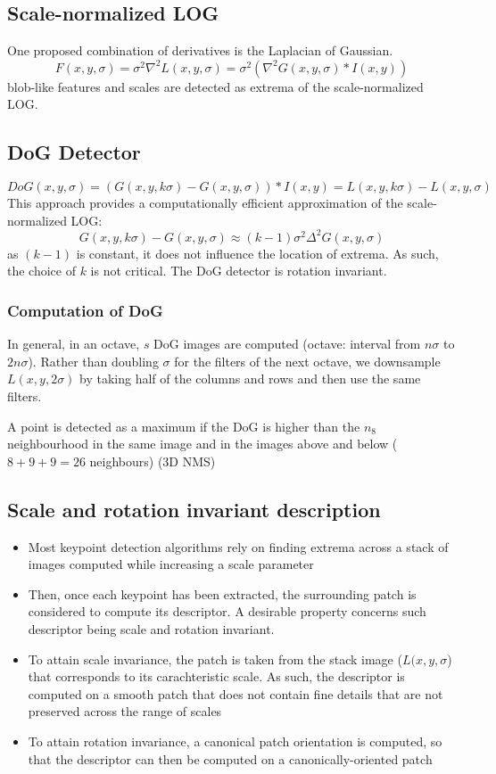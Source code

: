 \documentclass{article}
\begin{document}
\subsection{Scale-normalized LOG}
One proposed combination of derivatives is the Laplacian of Gaussian.
\[
    F(x,y,\sigma) = \sigma^2\nabla^2L(x,y,\sigma) = \sigma^2(\nabla^2 G(x,y,\sigma)\ast I(x,y))
\]
blob-like features and scales are detected as extrema of the scale-normalized LOG.
\subsection{DoG Detector}
\[
    DoG(x,y,\sigma) = (G(x,y,k\sigma)-G(x,y,\sigma))\ast I(x,y) = L(x,y,k\sigma)-L(x,y,\sigma)
\]
This approach provides a computationally efficient approximation of the scale-normalized LOG:
\[
    G(x,y,k\sigma)-G(x,y,\sigma)\approx (k-1)\sigma^2\Delta^2 G(x,y,\sigma)
\]
as $(k-1)$ is constant, it does not influence the location of extrema. As such, the choice of $k$ is not critical. The DoG detector is rotation invariant.
\subsubsection{Computation of DoG}
In general, in an octave, $s$ DoG images are computed (octave: interval from $n\sigma$ to $2n\sigma$). Rather than doubling $\sigma$ for the filters of the next octave, we downsample $L(x,y,2\sigma)$ by taking half of the columns and rows and then use the same filters.

A point is detected as a maximum if the DoG is higher than the $n_8$ neighbourhood in the same image and in the images above and below ($8+9+9=26$ neighbours) (3D NMS)

\subsection{Scale and rotation invariant description}
\begin{itemize}
    \item Most keypoint detection algorithms rely on finding extrema across a stack of images computed while increasing a scale parameter 
    \item Then, once each keypoint has been extracted, the surrounding patch is considered to compute its descriptor. A desirable property concerns such descriptor being scale and rotation invariant.
    \item To attain scale invariance, the patch is taken from the stack image ($L(x,y,\sigma$) that corresponds to its carachteristic scale. As such, the descriptor is computed on a smooth patch that does not contain fine details that are not preserved across the range of scales
    \item To attain rotation invariance, a canonical patch orientation is computed, so that the descriptor can then be computed on a canonically-oriented patch
\end{itemize}
\end{document}
